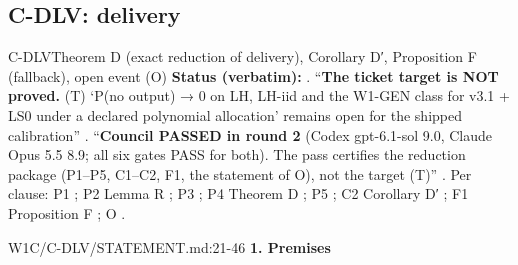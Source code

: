 \subsection{C-DLV: delivery}\label{sec:loop:dlv}
\begin{card}{C-DLV}{Theorem D (exact reduction of delivery), Corollary D′, Proposition F (fallback), open event (O)}
\textbf{Status (verbatim):}  . ``\textbf{The ticket target is NOT proved.} (T) `P(no output) → 0 on LH, LH-iid and the W1-GEN class for v3.1 + LS0 under a declared polynomial allocation' remains open for the shipped calibration'' . ``\textbf{Council PASSED in round 2} (Codex gpt-6.1-sol 9.0, Claude Opus 5.5 8.9; all six gates PASS for both). The pass certifies the reduction package (P1–P5, C1–C2, F1, the statement of O), not the target (T)'' . Per clause: P1 ; P2 Lemma R ; P3 ; P4 Theorem D ; P5 ; C2 Corollary D′ ; F1 Proposition F ; O  .
\begin{stmt}{W1C/C-DLV/STATEMENT.md:21-46}
\textbf{1. Premises}


\end{stmt}
\end{card}
